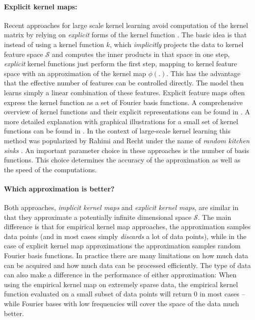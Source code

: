 \documentclass{article} %
\begin{document}
\paragraph{Explicit kernel maps:} Recent approaches for large scale kernel learning avoid computation of the kernel matrix by relying on {\em explicit} forms of the kernel function \cite{Rahimi2008,Vedaldi2010}. The basic idea is that instead of using a kernel function $k$, which {\em implicitly} projects the data to kernel feature space $\mathcal{S}$ and computes the inner products in that space in one step, {\em explicit} kernel functions just perform the first step, mapping to kernel feature space with an approximation of the kernel map $\phi(.)$. This has the advantage that the effective number of features can be controlled directly. The model then learns simply a linear combination of these features. Explicit feature maps often express the kernel function as a set of Fourier basis functions. A comprehensive overview of kernel functions and their explicit representations can be found in \cite{Dai2014}. A more detailed explanation with graphical illustrations for a small set of kernel functions can be found in \cite{Vedaldi2010}. In the context of large-scale kernel learning this method was popularized by Rahimi and Recht under the name of {\em random kitchen sinks} \cite{Rahimi2008}. An important parameter choice in these approaches is the number of basis functions. This choice determines the accuracy of the approximation as well as the speed of the computations. 

\paragraph{Which approximation is better?}
Both approaches, {\em implicit kernel maps} and {\em explicit kernel maps}, are similar in that they approximate a potentially infinite dimensional space $\mathcal{S}$. The main difference is that for empirical kernel map approaches, the approximation samples data points (and in most cases simply {\em discards} a lot of data points), while in the case of explicit kernel map approximations the approximation samples random Fourier basis functions. In practice there are many limitations on how much data can be acquired and how much data can be processed efficiently. The type of data can also make a difference in the performance of either approximation: When using the empirical kernel map on extremely sparse data, the empirical kernel function evaluated on a small subset of data points will return 0 in most cases -- while Fourier bases with low frequencies will cover the space of the data much better. 
\end{document}
